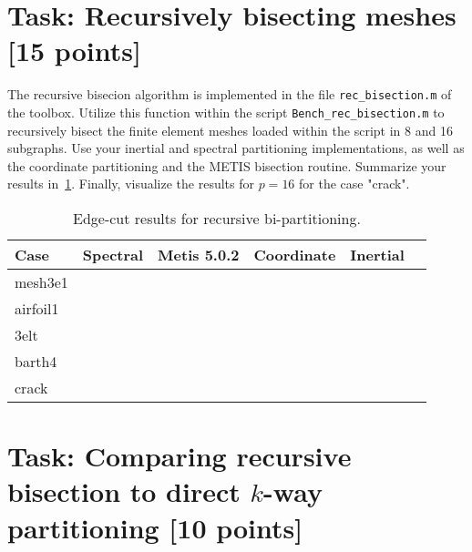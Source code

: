 \documentclass[unicode,11pt,a4paper,oneside,numbers=endperiod,openany]{scrartcl}
\begin{document}



\section{Task: Recursively bisecting meshes [15 points]}

The recursive bisecion algorithm is implemented in the file \texttt{rec\_bisection.m} of the toolbox. Utilize this function within the script \texttt{Bench\_rec\_bisection.m} to recursively bisect the finite element meshes loaded within the script in 8 and 16 subgraphs. Use your inertial and spectral partitioning implementations, as well as the coordinate partitioning and the METIS bisection routine. Summarize your results in~\ref{table:Rec_bisection}. Finally, visualize the results for $p= 16$ for the case "crack".

\begin{table}[h]
\caption{Edge-cut results for recursive bi-partitioning.}
\centering
\begin{tabular}{l|r|r|r|r|r} \hline\hline 
 Case            &  Spectral             &  Metis 5.0.2    & Coordinate & Inertial  \\ \hline
 mesh3e1         &                       &                 &            &           \\             
 airfoil1        &                       &                 &            &           \\ 
 3elt            &                       &                 &            &           \\ 
 barth4          &                       &                 &            &           \\ 
 crack           &                       &                 &            &           \\ \hline \hline
\end{tabular}
\label{table:Rec_bisection}
\end{table}


\section{Task: Comparing recursive bisection to direct $k$-way partitioning [10 points]}
\end{document}
